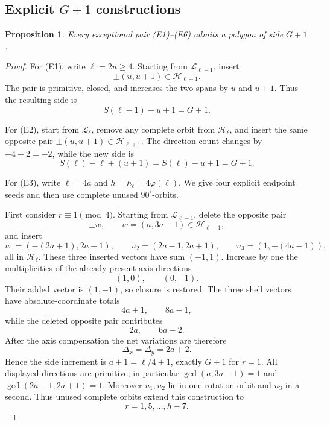 \documentclass[11pt]{article}
\newtheorem{proposition}[theorem]{Proposition}
\theoremstyle{definition}
\newcommand{\HH}{\mathcal H}
\newcommand{\LL}{\mathcal L}
\begin{document}
\subsection{Explicit \(G+1\) constructions}

\begin{proposition}\label{prop:gplus1}
Every exceptional pair \textup{(E1)}--\textup{(E6)} admits a polygon of side \(G+1\).
\end{proposition}

\begin{proof}
For (E1), write \(\ell=2u\ge4\).  Starting from \(\LL_{\ell-1}\), insert
\[
\pm(u,u+1)\in\HH_{\ell+1}.
\]
The pair is primitive, closed, and increases the two spans by \(u\) and \(u+1\).  Thus the resulting side is
\[
S(\ell-1)+u+1=G+1.
\]

For (E2), start from \(\LL_\ell\), remove any complete orbit from \(\HH_\ell\), and insert the same opposite pair
\(\pm(u,u+1)\in\HH_{\ell+1}\).  The direction count changes by \(-4+2=-2\), while the new side is
\[
S(\ell)-\ell+(u+1)
=
S(\ell)-u+1
=
G+1.
\]

For (E3), write \(\ell=4a\) and \(h=h_\ell=4\varphi(\ell)\).  We give four explicit endpoint seeds and then use complete unused \(90^\circ\)-orbits.

First consider \(r\equiv1\pmod4\).  Starting from \(\LL_{\ell-1}\), delete the opposite pair
\[
\pm w,\qquad w=(a,3a-1)\in\HH_{\ell-1},
\]
and insert
\[
u_1=(-(2a+1),2a-1),\qquad
u_2=(2a-1,2a+1),\qquad
u_3=(1,-(4a-1)),
\]
all in \(\HH_\ell\).  These three inserted vectors have sum \((-1,1)\).  Increase by one the multiplicities of the already present axis directions
\[
(1,0),\qquad(0,-1).
\]
Their added vector is \((1,-1)\), so closure is restored.  The three shell vectors have absolute-coordinate totals
\[
4a+1,\qquad 8a-1,
\]
while the deleted opposite pair contributes
\[
2a,\qquad 6a-2.
\]
After the axis compensation the net variations are therefore
\[
\Delta_x=\Delta_y=2a+2.
\]
Hence the side increment is \(a+1=\ell/4+1\), exactly \(G+1\) for \(r=1\).  All displayed directions are primitive; in particular
\(\gcd(a,3a-1)=1\) and \(\gcd(2a-1,2a+1)=1\).  Moreover \(u_1,u_2\) lie in one rotation orbit and \(u_3\) in a second.  Thus unused complete orbits extend this construction to
\[
r=1,5,\ldots,h-7.
\]


\end{proof}
\end{document}
